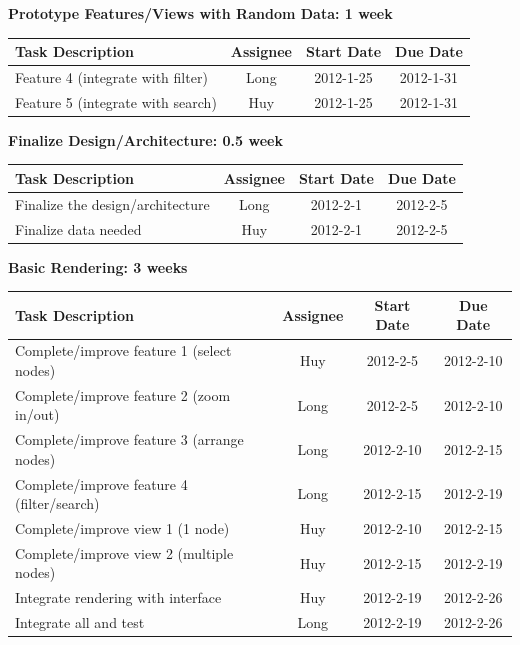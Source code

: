 \documentclass[12pt, letterpaper]{article}
\begin{document}
\begin{center}
		{\bf Prototype Features/Views with Random Data: 1 week}
    \begin{tabular}{| p{8.3cm} || c | c | c | }
      \hline
      Task Description & Assignee & Start Date & Due Date \\
      \hline
	    Feature 4 (integrate with filter)  & Long & 2012-1-25 & 2012-1-31 \\
            Feature 5 (integrate with search) & Huy & 2012-1-25 & 2012-1-31 \\
      \hline
    \end{tabular}
  \end{center}

  \begin{center}
		{\bf Finalize Design/Architecture: 0.5 week}
    \begin{tabular}{|p{8.3cm} || c | c | c | }
      \hline
      Task Description & Assignee & Start Date & Due Date \\
      \hline
	    Finalize the design/architecture & Long & 2012-2-1 & 2012-2-5 \\
	    Finalize data needed  & Huy & 2012-2-1 & 2012-2-5 \\
      \hline
    \end{tabular}
  \end{center}

  \begin{center}
		{\bf Basic Rendering: 3 weeks}
    \begin{tabular}{| p{8.3cm} || c | c | c | }
      \hline
      Task Description & Assignee & Start Date & Due Date \\
      \hline
 	    Complete/improve feature 1 (select nodes) & Huy & 2012-2-5 & 2012-2-10 \\
	    Complete/improve feature 2 (zoom in/out)  & Long & 2012-2-5 & 2012-2-10 \\
	    Complete/improve feature 3 (arrange nodes)  & Long & 2012-2-10 & 2012-2-15 \\
	    Complete/improve feature 4 (filter/search)  & Long & 2012-2-15 & 2012-2-19 \\
	    Complete/improve view 1 (1 node)  & Huy& 2012-2-10 & 2012-2-15 \\
            Complete/improve view 2 (multiple nodes)  & Huy & 2012-2-15 & 2012-2-19 \\
            Integrate rendering with interface  & Huy & 2012-2-19 & 2012-2-26 \\  
            Integrate all and test  & Long & 2012-2-19 & 2012-2-26 \\
      \hline
    \end{tabular}
  \end{center}
\end{document}
